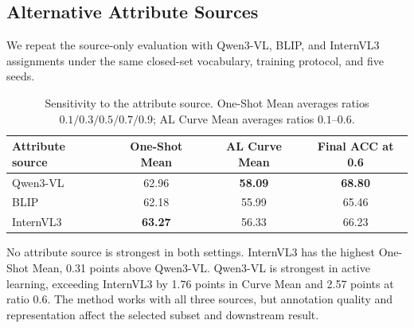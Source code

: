 \subsection{Alternative Attribute Sources}

We repeat the source-only evaluation with Qwen3-VL, BLIP, and InternVL3 assignments under the same closed-set vocabulary, training protocol, and five seeds.

\begin{table}[h]
\centering
\caption{Sensitivity to the attribute source. One-Shot Mean averages ratios $0.1/0.3/0.5/0.7/0.9$; AL Curve Mean averages ratios $0.1$--$0.6$.}
\label{tab:attribute-source-ablation}
\small
\setlength{\tabcolsep}{6pt}
\begin{tabular}{l c c c}
\toprule
\rowcolor{sectiongray} \textbf{Attribute source} & \textbf{One-Shot Mean} & \textbf{AL Curve Mean} & \textbf{Final ACC at 0.6} \\
\midrule
Qwen3-VL & 62.96 & \textbf{58.09} & \textbf{68.80} \\
BLIP & 62.18 & 55.99 & 65.46 \\
InternVL3 & \textbf{63.27} & 56.33 & 66.23 \\
\bottomrule
\end{tabular}
\end{table}

No attribute source is strongest in both settings. InternVL3 has the highest One-Shot Mean, 0.31 points above Qwen3-VL. Qwen3-VL is strongest in active learning, exceeding InternVL3 by 1.76 points in Curve Mean and 2.57 points at ratio $0.6$. The method works with all three sources, but annotation quality and representation affect the selected subset and downstream result.
